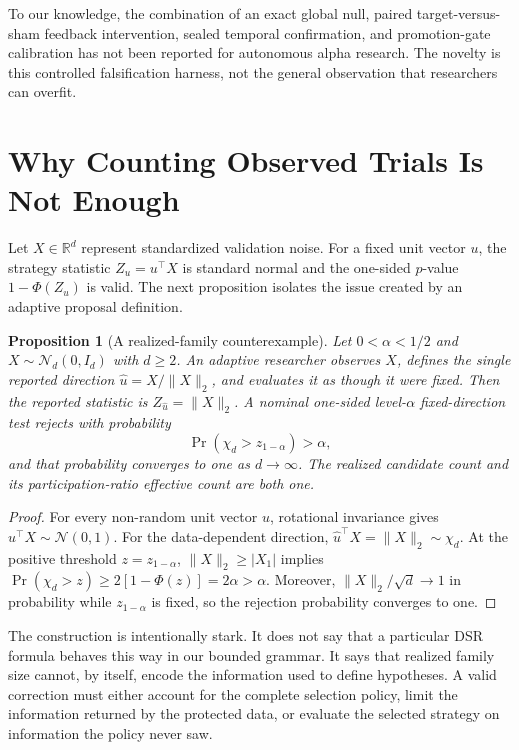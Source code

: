 \documentclass[sigconf,nonacm]{acmart}
\newtheorem{proposition}{Proposition}
\begin{document}
To our knowledge, the combination of an exact global null, paired target-versus-
sham feedback intervention, sealed temporal confirmation, and promotion-gate
calibration has not been reported for autonomous alpha research. The novelty is
this controlled falsification harness, not the general observation that
researchers can overfit.

\section{Why Counting Observed Trials Is Not Enough}

Let $X\in\mathbb{R}^{d}$ represent standardized validation noise. For a fixed
unit vector $u$, the strategy statistic $Z_u=u^\top X$ is standard normal and
the one-sided $p$-value $1-\Phi(Z_u)$ is valid. The next proposition isolates
the issue created by an adaptive proposal definition.

\begin{proposition}[A realized-family counterexample]
Let $0<\alpha<1/2$ and $X\sim\mathcal{N}_d(0,I_d)$ with $d\geq2$. An adaptive researcher observes
$X$, defines the single reported direction
$\widehat u=X/\lVert X\rVert_2$, and evaluates it as though it were fixed.
Then the reported statistic is $Z_{\widehat u}=\lVert X\rVert_2$. A nominal
one-sided level-$\alpha$ fixed-direction test rejects with probability
\[
  \Pr\!\left(\chi_d>z_{1-\alpha}\right)>\alpha,
\]
and that probability converges to one as $d\to\infty$. The realized candidate
count and its participation-ratio effective count are both one.
\end{proposition}

\begin{proof}
For every non-random unit vector $u$, rotational invariance gives
$u^\top X\sim\mathcal{N}(0,1)$. For the data-dependent direction,
$\widehat u^\top X=\lVert X\rVert_2\sim\chi_d$. At the positive threshold
$z=z_{1-\alpha}$, $\lVert X\rVert_2\geq |X_1|$ implies
$\Pr(\chi_d>z)\geq2[1-\Phi(z)]=2\alpha>\alpha$. Moreover,
$\lVert X\rVert_2/\sqrt d\to1$ in probability while
$z_{1-\alpha}$ is fixed, so the rejection probability converges to one.
\end{proof}

The construction is intentionally stark. It does not say that a particular DSR
formula behaves this way in our bounded grammar. It says that realized family
size cannot, by itself, encode the information used to define hypotheses. A
valid correction must either account for the complete selection policy, limit
the information returned by the protected data, or evaluate the selected
strategy on information the policy never saw.
\end{document}
